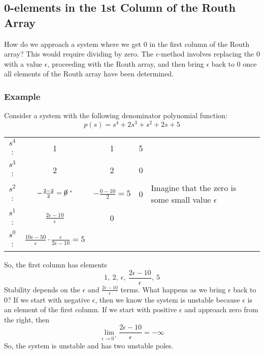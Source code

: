 \documentclass{book}
\newcommand{\exmp}{\subsubsection*{Example}}
\begin{document}
\subsection*{0-elements in the 1st Column of the Routh Array}
How do we approach a system where we get 0 in the first column of the Routh array? This would require dividing by zero. The $ \epsilon $-method involves replacing the 0 with a value $ \epsilon $, proceeding with the Routh array, and then bring $ \epsilon $ back to 0 once all elements of the Routh array have been determined.
\exmp
Consider a system with the following denominator polynomial function:
\[ p(s) = s^4 + 2s^3 + s^2 + 2s + 5 \]
\begin{center}
	\begin{tabular}{c c c c l}\vspace{1em}
		$ s^4 $: &  1 & 1 & 5 & \\ \vspace{1em}
		$ s^3 $: & 2 & 2 & 0 & \\ \vspace{1em}
		$ s^2 $: & $ -\frac{2-2}{2}=\cancel{0}^{\ \epsilon} $ & $ -\frac{0-10}{2}=5 $ & 0 &  Imagine that the zero is some small value $ \epsilon $ \\ \vspace{1em}
		$ s^1 $: & $ \frac{2\epsilon-10}{\epsilon} $ & 0& &\\ \vspace{1em}
		$ s^0 $: &  $ \frac{10\epsilon -50}{\epsilon}\cdot\frac{\epsilon}{2\epsilon-10} = 5$
	\end{tabular}
\end{center}
So, the first column has elements 
\[ 1,\ 2,\ \epsilon,\ \frac{2\epsilon-10}{\epsilon},\ 5 \]
Stability depends on the $ \epsilon $ and $ \frac{2\epsilon-10}{\epsilon} $ terms. What happens as we bring $ \epsilon $ back to 0? If we start with negative $ \epsilon $, then we know the system is unstable because $ \epsilon $ is an element of the first column. If we start with positive $ \epsilon $ and approach zero from the right, then
\[ \lim_{\epsilon\to0^+} \frac{2\epsilon-10}{\epsilon} = -\infty \]
So, the system is unstable and has two unstable poles.
\end{document}
